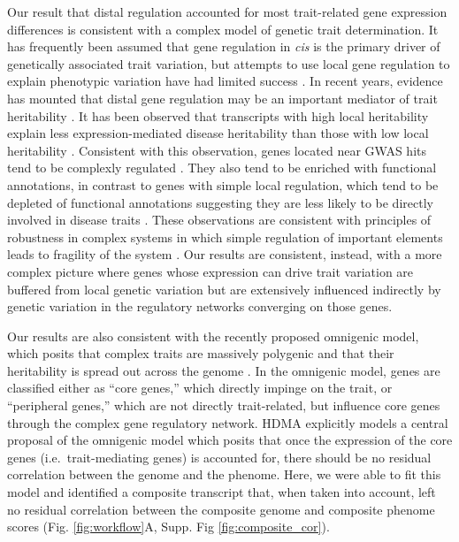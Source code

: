 \documentclass[
]{article}
\begin{document}
Our result that distal regulation accounted for most trait-related gene
expression differences is consistent with a complex model of genetic
trait determination. It has frequently been assumed that gene regulation
in \textit{cis} is the primary driver of genetically associated trait
variation, but attempts to use local gene regulation to explain
phenotypic variation have had limited success
\cite{pmid32912663, pmid36515579}. In recent years, evidence has mounted
that distal gene regulation may be an important mediator of trait
heritability \cite{pmid32424349, 
pmid37857933, pmid31051098, pmid34475573}. It has been observed that
transcripts with high local heritability explain less
expression-mediated disease heritability than those with low local
heritability \cite{pmid32424349}. Consistent with this observation,
genes located near GWAS hits tend to be complexly regulated
\cite{pmid37857933}. They also tend to be enriched with functional
annotations, in contrast to genes with simple local regulation, which
tend to be depleted of functional annotations suggesting they are less
likely to be directly involved in disease traits \cite{pmid37857933}.
These observations are consistent with principles of robustness in
complex systems in which simple regulation of important elements leads
to fragility of the system
\cite{pmid29782925, pmid12082173, pmid27304973}. Our results are
consistent, instead, with a more complex picture where genes whose
expression can drive trait variation are buffered from local genetic
variation but are extensively influenced indirectly by genetic variation
in the regulatory networks converging on those genes.

Our results are also consistent with the recently proposed omnigenic
model, which posits that complex traits are massively polygenic and that
their heritability is spread out across the genome \cite{pmid28622505}.
In the omnigenic model, genes are classified either as ``core genes,''
which directly impinge on the trait, or ``peripheral genes,'' which are
not directly trait-related, but influence core genes through the complex
gene regulatory network. HDMA explicitly models a central proposal of
the omnigenic model which posits that once the expression of the core
genes (i.e.~trait-mediating genes) is accounted for, there should be no
residual correlation between the genome and the phenome. Here, we were
able to fit this model and identified a composite transcript that, when
taken into account, left no residual correlation between the composite
genome and composite phenome scores (Fig. \ref{fig:workflow}A, Supp. Fig
\ref{fig:composite_cor}).
\end{document}
